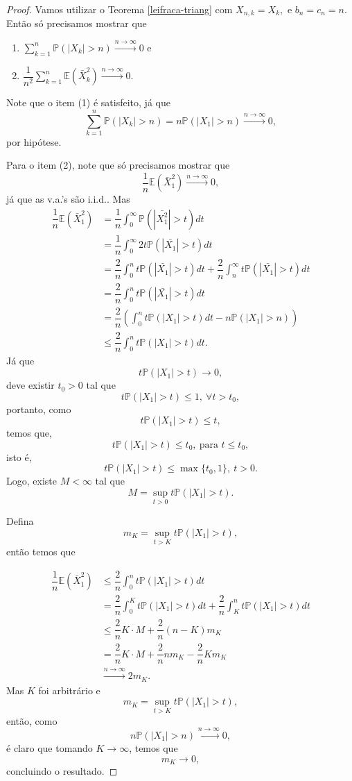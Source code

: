\documentclass[12pt,a4paper,oneside]{book}
\theoremstyle{definition}
\theoremstyle{remark}
\numberwithin{equation}{section}
\newcommand{\E}{\mathbb{E}}
\newcommand{\pr}{\mathbb{P}}
\newcommand{\rarrowlimn}{\xrightarrow{n\rightarrow \infty}}
\begin{document}
\begin{proof}
Vamos utilizar o Teorema  \ref{leifraca-triang} com $X_{n,k} = X_k,$ e $b_n=c_n=n.$ Então só precisamos mostrar que

\begin{enumerate}
\item $ \sum_{k=1}^n \pr(|X_{k}|>n) \xrightarrow{n\rightarrow\infty} 0$ e 
\item $ \dfrac{1}{n^2}\sum_{k=1}^n \E(\bar{X}_{k}^2) \xrightarrow{n\rightarrow\infty} 0$.
\end{enumerate} 
Note que o item (1) é satisfeito, já que
$$ \sum_{k=1}^n \pr(|X_{k}|>n) = n\pr(|X_{1}|>n)  \xrightarrow{n\rightarrow\infty} 0,$$por hipótese.

Para o item (2), note que só precisamos mostrar que
$$ \dfrac{1}{n} \E(\bar{X}_{1}^2) \xrightarrow{n\rightarrow\infty} 0,$$
já que as v.a.'s são i.i.d.. Mas
\begin{align*}
\dfrac{1}{n} \E(\bar{X}_{1}^2) & =\dfrac{1}{n} \int_0^\infty \pr(|\bar{X_1^2}|>t)dt \\
& =\dfrac{1}{n} \int_0^\infty 2t\pr(|\bar{X_1}|>t)dt \\
& =\dfrac{2}{n} \int_0^n t\pr(|\bar{X_1}|>t)dt+\dfrac{2}{n} \int_n^\infty t\pr(|\bar{X_1}|>t)dt \\
& =\dfrac{2}{n} \int_0^n t\pr(|\bar{X_1}|>t)dt\\
& =\dfrac{2}{n}\left( \int_0^n t\pr(|X_1|>t)dt - n\pr(|X_1|>n) \right) \\
&\leq \dfrac{2}{n} \int_0^n t\pr(|X_1|>t)dt.
\end{align*}
Já que $$ t\pr(|X_1|>t)\rightarrow 0,$$ deve existir $t_0>0$ tal que 
$$t\pr(|X_1|>t)\leq 1,\ \forall t>t_0, $$
portanto, como
$$ t\pr(|X_1|>t) \leq t,$$
temos que, 
$$t\pr(|X_1|>t)\leq t_0,\  \textrm{para }t\leq t_0,$$
isto é, 
$$t\pr(|X_1|>t) \leq \max\{t_0,1\},\ t> 0. $$
Logo, existe $M< \infty$ tal que
$$M = \sup_{t>0} t\pr(|X_1|>t).$$

Defina $$m_K = \sup_{t>K} t\pr(|X_1|>t),$$
então temos que  

\begin{align*}
\dfrac{1}{n} \E(\bar{X}_{1}^2) & \leq \dfrac{2}{n} \int_0^n t\pr(|X_1|>t)dt\\
& = \dfrac{2}{n} \int_0^K t\pr(|X_1|>t)dt+\dfrac{2}{n} \int_K^n t\pr(|X_1|>t)dt \\
&\leq \dfrac{2}{n} K\cdot M + \dfrac{2}{n} (n-K)m_K\\
&  = \dfrac{2}{n} K\cdot M + \dfrac{2}{n} nm_K -\dfrac{2}{n}Km_K \\
&  \rarrowlimn  2m_K.
\end{align*}
Mas $K$ foi arbitrário e $$m_K = \sup_{t>K} t\pr(|X_1|>t),$$
então,  como $$n\pr(|X_1|>n)\rarrowlimn 0,$$ é claro que tomando $K\rightarrow \infty$, temos que 
$$m_K \rightarrow 0,$$
concluindo o resultado.


\end{proof}
\end{document}
